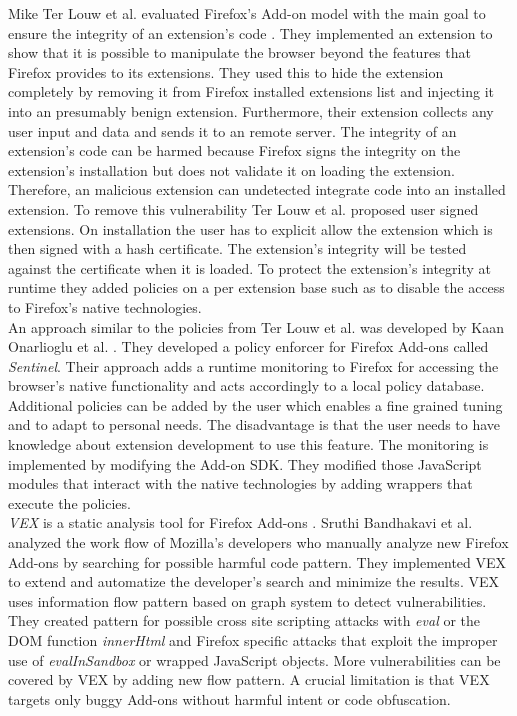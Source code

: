 \documentclass[article,colorback,accentcolor=tud9c,type=bsc]{tudthesis}
\begin{document}
	Mike Ter Louw et al. evaluated Firefox's Add-on model with the main goal to ensure the integrity of an extension's code \cite{TerLouw:2007:EWB:1420581.1420583}. They implemented an extension to show that it is possible to manipulate the browser beyond the features that Firefox provides to its extensions. They used this to hide the extension completely by removing it from Firefox installed extensions list and injecting it into an presumably benign extension. Furthermore, their extension collects any user input and data and sends it to an remote server. The integrity of an extension's code can be harmed because Firefox signs the integrity on the extension's installation but does not validate it on loading the extension. Therefore, an malicious extension can undetected integrate code into an installed extension. To remove this vulnerability Ter Louw et al. proposed user signed extensions. On installation the user has to explicit allow the extension which is then signed with a hash certificate. The extension's integrity will be tested against the certificate when it is loaded. To protect the extension's integrity at runtime they added policies on a per extension base such as to disable the access to Firefox's native technologies. \\ 
	
	An approach similar to the policies from Ter Louw et al. was developed by Kaan Onarlioglu et al. \cite{cs2015sentinel}. They developed a policy enforcer for Firefox Add-ons called \textit{Sentinel}. Their approach adds a runtime monitoring to Firefox for accessing the browser's native functionality and acts accordingly to a local policy database. Additional policies can be added by the user which enables a fine grained tuning and to adapt to personal needs. The disadvantage is that the user needs to have knowledge about extension development to use this feature. The monitoring is implemented by modifying the Add-on SDK. They modified those JavaScript modules that interact with the native technologies by adding wrappers that execute the policies. \\
	
	\textit{VEX} is a static analysis tool for Firefox Add-ons \cite{Bandhakavi:2011:VBE:1995376.1995398}. Sruthi Bandhakavi et al. analyzed the work flow of Mozilla's developers who manually analyze new Firefox Add-ons by searching for possible harmful code pattern. They implemented VEX to extend and automatize the developer's search and minimize the results. VEX uses information flow pattern based on graph system to detect vulnerabilities. They created pattern for possible cross site scripting attacks with \textit{eval} or the DOM function \textit{innerHtml} and Firefox specific attacks that exploit the improper use of \textit{evalInSandbox} or wrapped JavaScript objects. More vulnerabilities can be covered by VEX by adding new flow pattern. A crucial limitation is that VEX targets only buggy Add-ons without harmful intent or code obfuscation. \\
\end{document}
